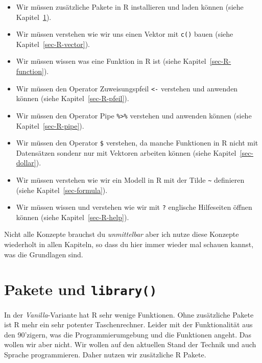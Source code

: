 \documentclass[
  letterpaper,
]{scrbook}
\providecommand{\tightlist}{%
  \setlength{\itemsep}{0pt}\setlength{\parskip}{0pt}}\usepackage{longtable,booktabs,array}
\begin{document}
\begin{itemize}
\tightlist
\item
  Wir müssen zusätzliche Pakete in R installieren und laden können
  (siehe Kapitel~\ref{sec-R-packages}).
\item
  Wir müssen verstehen wie wir uns einen Vektor mit \texttt{c()} bauen
  (siehe Kapitel~\ref{sec-R-vector}).
\item
  Wir müssen wissen was eine Funktion in R ist (siehe
  Kapitel~\ref{sec-R-function}).
\item
  Wir müssen den Operator Zuweisungspfeil \texttt{\textless{}-}
  verstehen und anwenden können (siehe Kapitel~\ref{sec-R-pfeil}).
\item
  Wir müssen den Operator Pipe \texttt{\%\textgreater{}\%} verstehen und
  anwenden können (siehe Kapitel~\ref{sec-R-pipe}).
\item
  Wir müssen den Operator \texttt{\$} verstehen, da manche Funktionen in
  R nicht mit Datensätzen sondenr nur mit Vektoren arbeiten können
  (siehe Kapitel~\ref{sec-dollar}).
\item
  Wir müssen verstehen wie wir ein Modell in R mit der Tilde
  \texttt{\textasciitilde{}} definieren (siehe
  Kapitel~\ref{sec-formula}).
\item
  Wir müssen wissen und verstehen wie wir mit \texttt{?} englische
  Hilfeseiten öffnen können (siehe Kapitel~\ref{sec-R-help}).
\end{itemize}

Nicht alle Konzepte brauchst du \emph{unmittelbar} aber ich nutze diese
Konzepte wiederholt in allen Kapiteln, so dass du hier immer wieder mal
schauen kannst, was die Grundlagen sind.

\hypertarget{sec-R-packages}{%
\section{\texorpdfstring{Pakete und
\texttt{library()}}{Pakete und library()}}\label{sec-R-packages}}

{}

In der \emph{Vanilla}-Variante hat R sehr wenige Funktionen. Ohne
zusätzliche Pakete ist R mehr ein sehr potenter Taschenrechner. Leider
mit der Funktionalität aus den 90'zigern, was die Programmierumgebung
und die Funktionen angeht. Das wollen wir aber nicht. Wir wollen auf den
aktuellen Stand der Technik und auch Sprache programmieren. Daher nutzen
wir zusätzliche R Pakete.
\end{document}
